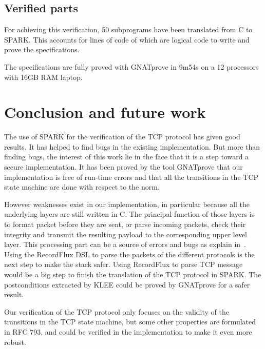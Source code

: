 \documentclass[conference]{IEEEtran}
\begin{document}

\subsection{Verified parts}

For achieving this verification, 50 subprograms have been translated from C to
SPARK. This accounts for  lines of code of which  are logical
code to write and prove the specifications.

The specifications are fully proved with GNATprove in 9m54s on a 12 processors with 16GB RAM laptop.


\section{Conclusion and future work}

The use of SPARK for the verification of the TCP protocol has given good
results. It has helped to find bugs in the existing implementation. But more
than finding bugs, the interest of this work lie in the face that it is a
step toward a secure implementation. It has been proved by the tool GNATprove
that our implementation is free of run-time errors and that all the transitions
in the TCP state machine are done with respect to the norm.

However weaknesses exist in our implementation, in particular because all the
underlying layers are still written in C. The principal function of those layers
is to format packet before they are sent, or parse incoming packets, check their
integrity and transmit the resulting payload to the corresponding upper level
layer. This processing part can be a source of errors and bugs as explain
in~\cite{Reiher2019RecordFluxFM}.
Using the RecordFlux DSL to parse the packets of the different protocols is the
next step to make the stack safer. Using RecordFlux to parse TCP message
would be a big step to finish the translation of the TCP protocol in SPARK.
The postconditions extracted by KLEE could be proved by GNATprove for a
safer result.

Our verification of the TCP protocol only focuses on the validity of the
transitions in the TCP state machine, but some other properties are formulated
in RFC 793, and could be verified in the implementation to make it even
more robust.





\end{document}
